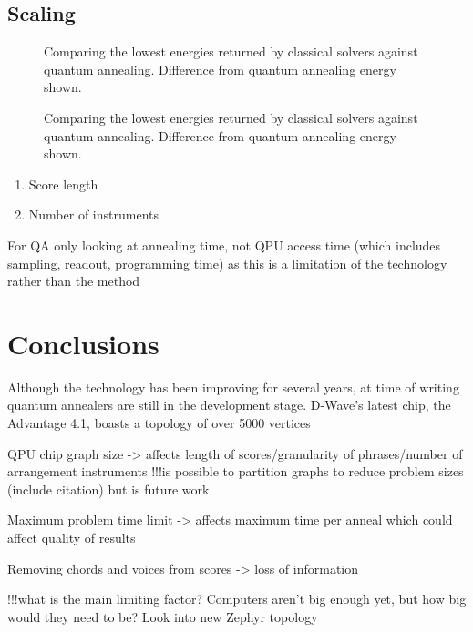 \documentclass[12pt]{article}
\theoremstyle{definition}
\begin{document}
\subsection{Scaling}

\begin{figure}[h]
    \centering\footnotesize
    
    \caption{Comparing the lowest energies returned by classical solvers against quantum annealing. Difference from quantum annealing energy shown.}
    \label{fig:energy-scaling}
\end{figure}

\begin{figure}[h]
    \centering\footnotesize
    
    \caption{Comparing the lowest energies returned by classical solvers against quantum annealing. Difference from quantum annealing energy shown.}
    \label{fig:time-scaling}
\end{figure}

\begin{enumerate}
    \item Score length
    \item Number of instruments
\end{enumerate}

For QA only looking at annealing time, not QPU access time (which includes sampling, readout, programming time) as this is a limitation of the technology rather than the method

\section{Conclusions}


Although the technology has been improving for several years, at time of writing quantum annealers are still in the development stage. D-Wave's latest chip, the Advantage 4.1, boasts a topology of over \num{5000} vertices

QPU chip graph size -> affects length of scores/granularity of phrases/number of arrangement instruments
!!!is possible to partition graphs to reduce problem sizes (include citation) but is future work

Maximum problem time limit -> affects maximum time per anneal which could affect quality of results

Removing chords and voices from scores -> loss of information

!!!what is the main limiting factor?
Computers aren't big enough yet, but how big would they need to be? Look into new Zephyr topology
\end{document}
